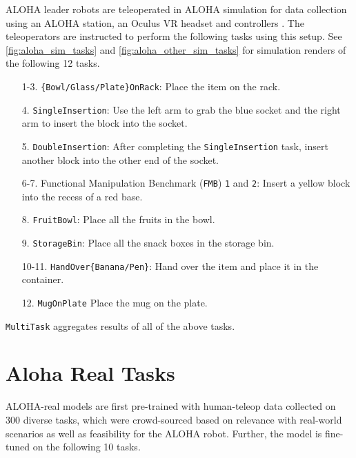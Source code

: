 ALOHA leader robots are teleoperated in ALOHA simulation for data collection using an ALOHA station, an Oculus VR headset and controllers \citep{zhao2024aloha}.
The teleoperators are instructed to perform the following tasks using this setup.
See \cref{fig:aloha_sim_tasks} and \cref{fig:aloha_other_sim_tasks} for simulation renders of the following 12 tasks.
\begin{enumerate}
    \item[1-3.] \texttt{\{Bowl/Glass/Plate\}OnRack}: Place the item on the rack.
    \item[4.] \texttt{SingleInsertion}: Use the left arm to grab the blue socket and the right arm to insert the block into the socket.
    \item[5.] \texttt{DoubleInsertion}: After completing the \texttt{SingleInsertion} task, insert another block into the other end of the socket.
    \item[6-7.] Functional Manipulation Benchmark (\texttt{FMB}) \texttt{1} and \texttt{2}: Insert a yellow block into the recess of a red base.
    \item[8.] \texttt{FruitBowl}: Place all the fruits in the bowl.
    \item[9.] \texttt{StorageBin}: Place all the snack boxes in the storage bin.
    \item[10-11.] \texttt{HandOver\{Banana/Pen\}}: Hand over the item and place it in the container.
    \item[12.] \texttt{MugOnPlate} Place the mug on the plate.
\end{enumerate}
\texttt{MultiTask} aggregates results of all of the above tasks.

\section{Aloha Real Tasks}
ALOHA-real models are first pre-trained with human-teleop data collected on 300 diverse tasks, which were crowd-sourced based on relevance with real-world scenarios as well as feasibility for the ALOHA robot. Further, the model is fine-tuned on the following 10 tasks.

